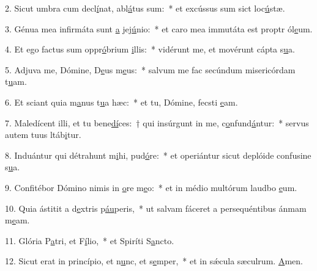 2. Sicut umbra cum decl\uline{í}nat, abl\uline{á}tus sum:~* et excússus sum sict loc\uline{ú}stæ.\par 
3. Génua mea infirmáta sunt \uline{a} jej\uline{ú}nio:~* et caro mea immutáta est proptr ól\uline{e}um.\par 
4. Et ego factus sum oppr\uline{ó}brium \uline{i}llis:~* vidérunt me, et movérunt cápta s\uline{u}a.\par 
5. Adjuva me, Dómine, D\uline{e}us m\uline{e}us:~* salvum me fac secúndum misericórdam t\uline{u}am.\par 
6. Et sciant quia m\uline{a}nus t\uline{u}a hæc:~* et tu, Dómine, fecsti \uline{e}am.\par 
7. Maledícent illi, et tu bene\uline{dí}ces:~† qui insúrgunt in me, c\uline{o}nfund\uline{á}ntur:~* servus autem tuus ltáb\uline{i}tur.\par 
8. Induántur qui détrahunt m\uline{i}hi, pud\uline{ó}re:~* et operiántur sicut deplóide confusine s\uline{u}a.\par 
9. Confitébor Dómino nimis in \uline{o}re m\uline{e}o:~* et in médio multórum laudbo \uline{e}um.\par 
10. Quia ástitit a d\uline{e}xtris p\uline{áu}peris,~* ut salvam fáceret a persequéntibus ánmam m\uline{e}am.\par 
11. Glória P\uline{a}tri, et F\uline{í}lio,~* et Spiríti S\uline{a}ncto.\par 
12. Sicut erat in princípio, et n\uline{u}nc, et s\uline{e}mper,~* et in sǽcula sæculrum. \uline{A}men.\par 
